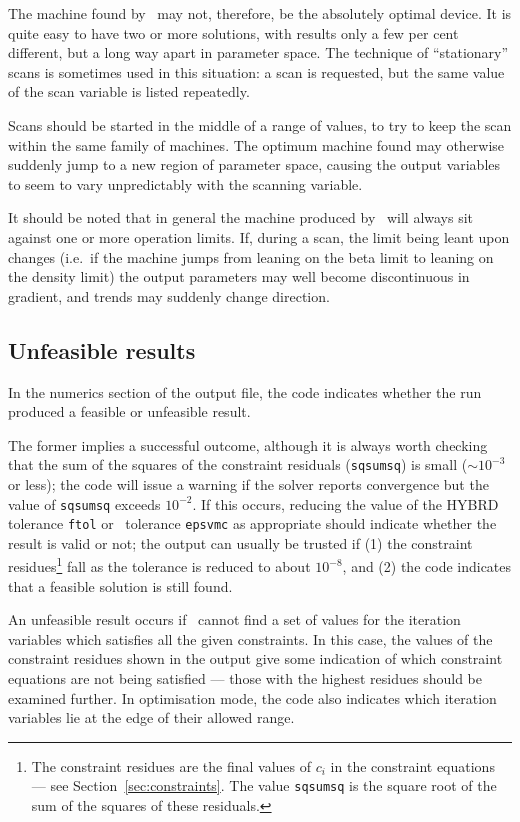 The machine found by \process\ may not, therefore, be the absolutely optimal
device. It is quite easy to have two or more solutions, with results only a
few per cent different, but a long way apart in parameter space. The technique
of ``stationary'' scans is sometimes used in this situation: a scan is requested, but the same value of the scan variable is listed repeatedly.

Scans should be started in the middle of a range of values, to try to keep the
scan within the same family of machines. The optimum machine found may
otherwise suddenly jump to a new region of parameter space, causing the output
variables to seem to vary unpredictably with the scanning variable.

It should be noted that in general the machine produced by \process\ will
always sit against one or more operation limits. If, during a scan, the limit
being leant upon changes (i.e.\ if the machine jumps from leaning on the beta
limit to leaning on the density limit) the output parameters may well become
discontinuous in gradient, and trends may suddenly change direction.

\subsection{Unfeasible results}

In the numerics section of the output file, the code indicates whether the run
produced a feasible or unfeasible result.

The former implies a successful outcome, although it is always worth checking
that the sum of the squares of the constraint residuals (\texttt{sqsumsq}) is small ($\sim
10^{-3}$ or less); the code will issue a warning if the solver reports convergence but
the value of \texttt{sqsumsq} exceeds $10^{-2}$. If this occurs, reducing the
value of the HYBRD tolerance \texttt{ftol} or \vmcon\ tolerance
\texttt{epsvmc} as appropriate should indicate whether the result is valid
or not; the output can usually be trusted if (1) the constraint
residues\footnote{The constraint residues are the final values of $c_i$ in the
  constraint equations --- see Section~\ref{sec:constraints}. The value
  \texttt{sqsumsq} is the square root of the sum of the squares of these
  residuals.} fall as the tolerance is reduced to about $10^{-8}$, and (2) the
code indicates that a feasible solution is still found.

An unfeasible result occurs if \process\ cannot find a set of values for the
iteration variables which satisfies all the given constraints. In this case,
the values of the constraint residues shown in the output give some indication
of which constraint equations are not being satisfied --- those with the
highest residues should be examined further. In optimisation mode, the code
also indicates which iteration variables lie at the edge of their allowed
range.

